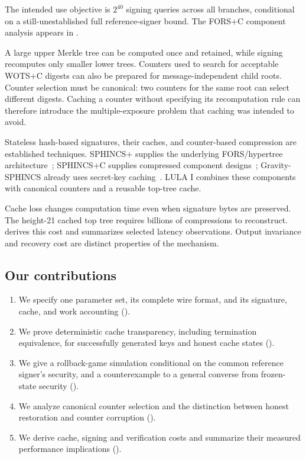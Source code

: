 \documentclass[a4paper,envcountsame,runningheads]{llncs}
\begin{document}
The intended use objective is $2^{40}$ signing queries across all branches, conditional on a still-unestablished full reference-signer bound. The FORS+C component analysis appears in .

A large upper Merkle tree can be computed once and retained, while signing recomputes only smaller lower trees. Counters used to search for acceptable WOTS+C digests can also be prepared for message-independent child roots. Counter selection must be canonical: two counters for the same root can select different digests. Caching a counter without specifying its recomputation rule can therefore introduce the multiple-exposure problem that caching was intended to avoid.

Stateless hash-based signatures, their caches, and counter-based compression are established techniques. SPHINCS+ supplies the underlying FORS/hypertree architecture~\cite{sphincs}; SPHINCS+C supplies compressed component designs~\cite{sphincsc}; Gravity-SPHINCS already uses secret-key caching~\cite{gravity}. LULA I combines these components with canonical counters and a reusable top-tree cache.

Cache loss changes computation time even when signature bytes are preserved. The height-21 cached top tree requires billions of compressions to reconstruct.  derives this cost and summarizes selected latency observations. Output invariance and recovery cost are distinct properties of the mechanism.

\subsection{Our contributions}\label{sec:scope}

\begin{enumerate}
\item We specify one parameter set, its complete wire format, and its signature, cache, and work accounting ().
\item We prove deterministic cache transparency, including termination equivalence, for successfully generated keys and honest cache states ().
\item We give a rollback-game simulation conditional on the common reference signer's security, and a counterexample to a general converse from frozen-state security ().
\item We analyze canonical counter selection and the distinction between honest restoration and counter corruption ().
\item We derive cache, signing and verification costs and summarize their measured performance implications ().
\end{enumerate}
\end{document}
